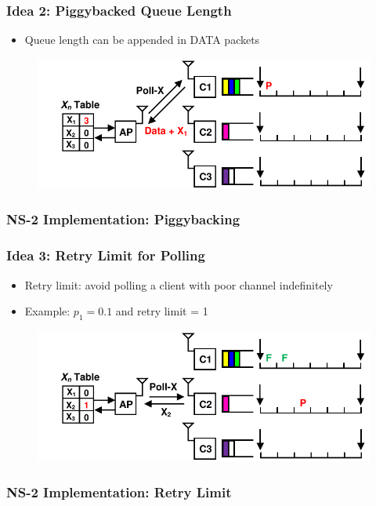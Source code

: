 \documentclass{beamer}
\begin{document}
\begin{frame}
\frametitle{Idea 2: Piggybacked Queue Length}
\begin{itemize}
\item Queue length can be appended in DATA packets
\end{itemize}
\begin{figure}
\centering
\includegraphics[scale=0.8]{piggyback_1.pdf}
\end{figure}
\end{frame}

\begin{frame}
\frametitle{NS-2 Implementation: Piggybacking}
\end{frame}

\begin{frame}
\frametitle{Idea 3: Retry Limit for Polling}
\begin{itemize}
\item Retry limit: avoid polling a client with poor channel indefinitely
\item Example: $p_1=0.1$ and retry limit = 1
\end{itemize}
\begin{figure}
\centering
\includegraphics[scale=0.8]{retry_1.pdf}
\end{figure}
\end{frame}

\begin{frame}
\frametitle{NS-2 Implementation: Retry Limit}
\end{frame}
\end{document}
